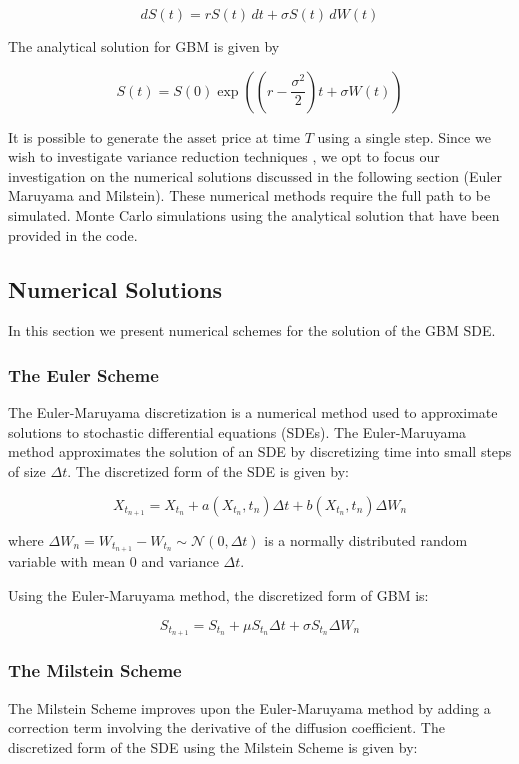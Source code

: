 \documentclass{article}
\newcommand{\para}{\vspace{8pt}} %
\begin{document}
\[
dS(t) = r S(t) \, dt + \sigma S(t) \, dW(t)
\]

The analytical solution for GBM is given by

\[
S(t) = S(0) \exp \left( \left( r - \frac{\sigma^2}{2} \right) t + \sigma W(t) \right)
\]

It is possible to generate the asset price at time $T$ using a single step. Since we wish to investigate variance reduction techniques ,
we opt to focus our investigation on the numerical solutions discussed in the following section (Euler Maruyama and Milstein). These numerical methods
require the full path to be simulated. Monte Carlo simulations using the analytical solution that have been provided in the code.

\subsection{Numerical Solutions}

In this section we present numerical schemes for the solution of the GBM SDE. 

\subsubsection{The Euler Scheme}

The Euler-Maruyama discretization is a numerical method used to approximate solutions to stochastic differential equations (SDEs). The Euler-Maruyama method approximates 
the solution of an SDE by discretizing time into small steps of size $\Delta t$. The discretized form of the SDE is given by:

\[
X_{t_{n+1}} = X_{t_n} + a(X_{t_n}, t_n) \Delta t + b(X_{t_n}, t_n) \Delta W_n
\]

where $\Delta W_n = W_{t_{n+1}} - W_{t_n} \sim \mathcal{N}(0, \Delta t)$ is a normally distributed random variable with mean 0 and variance $\Delta t$.

\para
Using the Euler-Maruyama method, the discretized form of GBM is:

\[
S_{t_{n+1}} = S_{t_n} + \mu S_{t_n} \Delta t + \sigma S_{t_n} \Delta W_n
\]

\subsubsection{The Milstein Scheme}

The Milstein Scheme improves upon the Euler-Maruyama method by adding a correction term involving the derivative of the diffusion coefficient. 
The discretized form of the SDE using the Milstein Scheme is given by:
\end{document}
